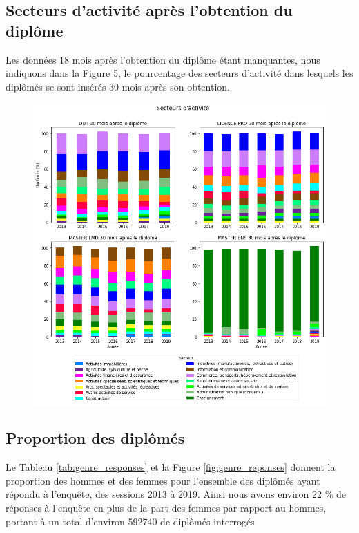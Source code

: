 \documentclass[12pt, a4paper, titlepage, table]{article}
\begin{document}
	\subsection{Secteurs d'activité après l'obtention du diplôme}
	Les données 18 mois après l'obtention du diplôme étant manquantes, nous indiquons dans la Figure 5, le pourcentage des secteurs d'activité dans lesquels les diplômés se sont insérés 30 mois après son obtention. 

	\begin{figure}[H]
		\centering
		\includegraphics[width=1\textwidth]{../graphs/repartition_secteurs_situation.png}
	\end{figure}

	\subsection{Proportion des diplômés}
	Le Tableau \ref{tab:genre_responses} et la Figure \ref{fig:genre_reponses} donnent la proportion des hommes et des femmes pour l'ensemble des diplômés ayant répondu à l'enquête, des sessions 2013 à 2019. Ainsi nous avons environ 22 \% de réponses à l'enquête en plus de la part des femmes par rapport au hommes, portant à un total d'environ 592740 de diplômés interrogés
	
\end{document}
